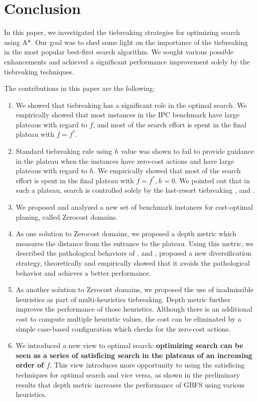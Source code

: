 
\section{Conclusion}

In this paper, we investigated the tiebreaking strategies for optimizing search using A*. Our goal was to shed some
light on the importance of the tiebreaking in the most popular best-first search algorithm. We sought various
possible enhancements and achieved a significant performance improvement solely by the tiebreaking techniques.

The contributions in this paper are the following:

\begin{enumerate}
 \item We showed that tiebreaking has a significant role in the optimal
       search. We empirically showed that most instances in the IPC
       benchmark have large plateaus with regard to $f$, and most of the
       search effort is spent in the final plateau with $f=f^*$.
 \item Standard tiebreaking rule using $h$ value was shown to fail to
       provide guidance in the plateau when the instances have zero-cost
       actions and have large plateaus with regard to $h$.
       We empirically showed that most of the search effort is spent in
       the final plateau with $f=f^*, h=0$. We pointed out that in such
       a plateau, search is controlled solely by the
       last-resort tiebreaking \fifo, \lifo and \ro.
 \item We proposed and analyzed a new set of benchmark
       instances for cost-optimal planing, called Zerocost domains.
 \item As one solution to Zerocost domains, we proposed a depth metric
       which measures the distance from the entrance to the
       plateau. Using this metric, we described the pathological
       behaviors of \fifo, \lifo and \ro, proposed a new diversification
       strategy, theoretically and empirically showed that it avoids the
       pathological behavior and achieves a better performance.
 \item As another solution to Zerocost domains, we proposed the use of
       inadmissible heuristics as part of multi-heuristics tiebreaking.
       Depth metric further improves the performance of those
       heuristics. Although there is an additional cost to compute
       multiple heuristic values, the cost can be eliminated by a simple
       case-based configuration which checks for the zero-cost actions.
 \item We introduced a new view to optimal \astar search:
       \textbf{optimizing search can be seen as a series of
       satisficing search in the plateaus of an increasing order of
       $f$}. This view introduces more opportunity to using the
       satisficing techniques for optimal search and vice versa, as
       shown in the preliminary results that depth metric increases the
       performance of GBFS using various heuristics.
\end{enumerate}


